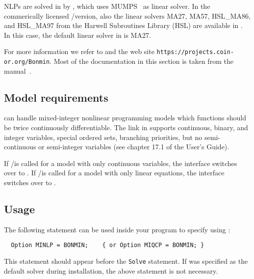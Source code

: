 NLPs are solved in \BONMIN by \IPOPT, which uses \textsc{MUMPS}~\cite{AmestoyDuffKosterLExcellent2001,AmestoyGuermoucheLExcellentPralet2006} as linear solver.
In the commerically licensed \GAMS/\BONMINH version, also the linear solvers \textsc{MA27}, \textsc{MA57}, \textsc{HSL\_MA86}, and \textsc{HSL\_MA97} from the Harwell Subroutines Library (HSL) are available in \IPOPT.
In this case, the default linear solver in \IPOPT is MA27.


For more information we refer to \cite{BoCoLoMa06,BoGo08,BoKiLi09,BBCCGLLLMSW} and the \BONMIN web site \texttt{https://projects.coin-or.org/Bonmin}.
Most of the \BONMIN documentation in this section is taken from the \BONMIN manual~\cite{BonminManual}.


\subsection{Model requirements}

\BONMIN can handle mixed-integer nonlinear programming models which functions should be twice continuously differentiable.
The \BONMIN link in \GAMS supports continuous, binary, and integer variables, special ordered sets, branching priorities, but no semi-continuous or semi-integer variables (see chapter 17.1 of the \GAMS User's Guide).

If \GAMS/\BONMIN is called for a model with only continuous variables, the interface switches over to \IPOPT.
If \GAMS/\BONMIN is called for a model with only linear equations, the interface switches over to \CBC.

\subsection{Usage}

The following statement can be used inside your \GAMS program to specify using \BONMIN:
\begin{verbatim}
  Option MINLP = BONMIN;    { or Option MIQCP = BONMIN; }
\end{verbatim}
This statement should appear before the \texttt{Solve} statement.
If \BONMIN was specified as the default solver during \GAMS installation, the above statement is not necessary.

